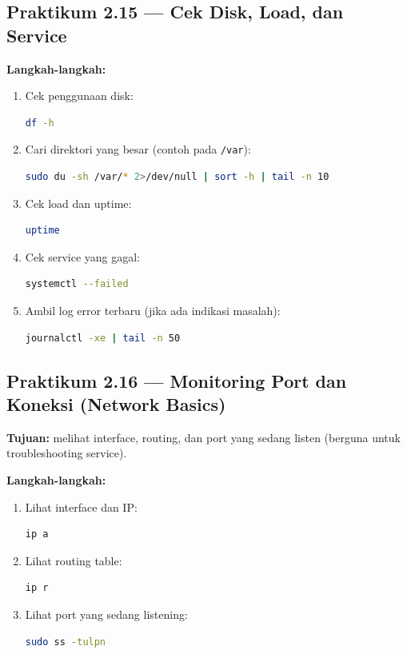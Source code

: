 \subsection*{Praktikum 2.15 --- Cek Disk, Load, dan Service}
\textbf{Langkah-langkah:}
\begin{enumerate}
    \item Cek penggunaan disk:
\begin{lstlisting}[language=bash, caption={Cek kapasitas disk}]
df -h
\end{lstlisting}

    \item Cari direktori yang besar (contoh pada \texttt{/var}):
\begin{lstlisting}[language=bash, caption={Cek ukuran direktori (contoh /var)}]
sudo du -sh /var/* 2>/dev/null | sort -h | tail -n 10
\end{lstlisting}

    \item Cek load dan uptime:
\begin{lstlisting}[language=bash, caption={Cek load average}]
uptime
\end{lstlisting}

    \item Cek service yang gagal:
\begin{lstlisting}[language=bash, caption={Service yang gagal}]
systemctl --failed
\end{lstlisting}

    \item Ambil log error terbaru (jika ada indikasi masalah):
\begin{lstlisting}[language=bash, caption={Log error terbaru}]
journalctl -xe | tail -n 50
\end{lstlisting}
\end{enumerate}

\subsection*{Praktikum 2.16 --- Monitoring Port dan Koneksi (Network Basics)}
\textbf{Tujuan:} melihat interface, routing, dan port yang sedang listen (berguna untuk troubleshooting service).

\textbf{Langkah-langkah:}
\begin{enumerate}
    \item Lihat interface dan IP:
\begin{lstlisting}[language=bash, caption={Cek IP address}]
ip a
\end{lstlisting}

    \item Lihat routing table:
\begin{lstlisting}[language=bash, caption={Cek routing}]
ip r
\end{lstlisting}

    \item Lihat port yang sedang listening:
\begin{lstlisting}[language=bash, caption={Cek port listening}]
sudo ss -tulpn
\end{lstlisting}
\end{enumerate}

